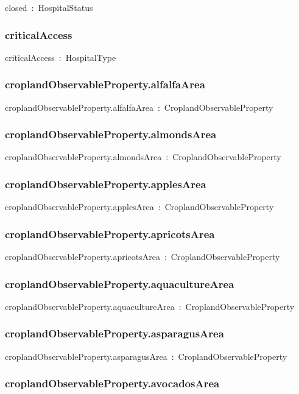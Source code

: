 \documentclass{article}
\begin{document}
closed~:~HospitalStatus

\subsubsection*{criticalAccess}

criticalAccess~:~HospitalType

\subsubsection*{croplandObservableProperty.alfalfaArea}

croplandObservableProperty.alfalfaArea~:~CroplandObservableProperty

\subsubsection*{croplandObservableProperty.almondsArea}

croplandObservableProperty.almondsArea~:~CroplandObservableProperty

\subsubsection*{croplandObservableProperty.applesArea}

croplandObservableProperty.applesArea~:~CroplandObservableProperty

\subsubsection*{croplandObservableProperty.apricotsArea}

croplandObservableProperty.apricotsArea~:~CroplandObservableProperty

\subsubsection*{croplandObservableProperty.aquacultureArea}

croplandObservableProperty.aquacultureArea~:~CroplandObservableProperty

\subsubsection*{croplandObservableProperty.asparagusArea}

croplandObservableProperty.asparagusArea~:~CroplandObservableProperty

\subsubsection*{croplandObservableProperty.avocadosArea}
\end{document}
